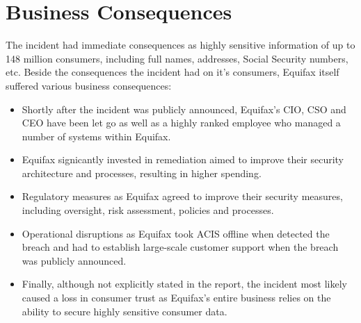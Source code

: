 \section{Business Consequences}
The incident had immediate consequences as highly sensitive information of up to 148 million consumers, including full names, addresses, Social Security numbers, etc.
\newline
Beside the consequences the incident had on it's consumers, Equifax itself suffered various business consequences:
\begin{itemize}
\item Shortly after the incident was publicly announced, Equifax's CIO, CSO and CEO have been let go as well as a highly ranked employee who managed a number of systems within Equifax.
\item Equifax signicantly invested in remediation aimed to improve their security architecture and processes, resulting in higher spending.
\item Regulatory measures as Equifax agreed to improve their security measures, including oversight, risk assessment, policies and processes.
\item Operational disruptions as Equifax took ACIS offline when detected the breach and had to establish large-scale customer support when the breach was publicly announced.
\item Finally, although not explicitly stated in the report, the incident most likely caused a loss in consumer trust as Equifax's entire business relies on the ability to secure highly sensitive consumer data.
\end{itemize}